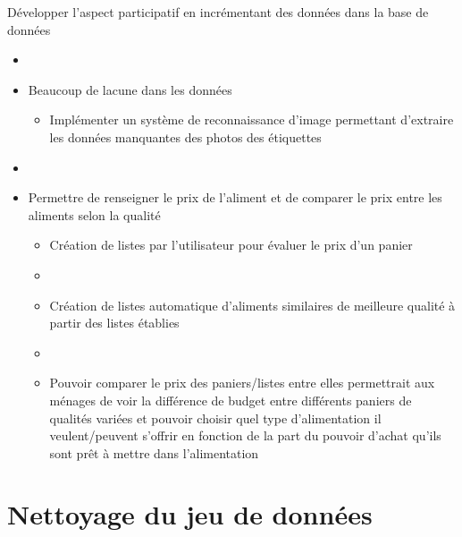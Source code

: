 \begin{frame}{\insertsubsection}
  Développer l'aspect participatif en incrémentant des données dans la base de données
  \begin{itemize}
    \item[]
    \item Beaucoup de lacune dans les données
          \begin{itemize}
            \item[] Implémenter un système de reconnaissance d'image
              permettant d'extraire les données manquantes des photos des étiquettes
          \end{itemize}
    \item[]
    \item Permettre de renseigner le prix de l'aliment et  de comparer le prix
          entre les aliments selon la qualité
          \begin{itemize}
            \item Création de listes par l'utilisateur pour évaluer le prix d'un panier
            \item[]
            \item Création de listes automatique d'aliments similaires de meilleure qualité à partir des listes établies
            \item[]
            \item Pouvoir comparer le prix des paniers/listes entre elles permettrait aux ménages de voir
                  la différence de budget entre différents paniers de qualités variées
                  et pouvoir choisir quel type d'alimentation il veulent/peuvent s'offrir
                  en fonction de la part du pouvoir d'achat qu'ils sont prêt à mettre dans l'alimentation
          \end{itemize}
  \end{itemize}
\end{frame}

\section{Nettoyage du jeu de données}
